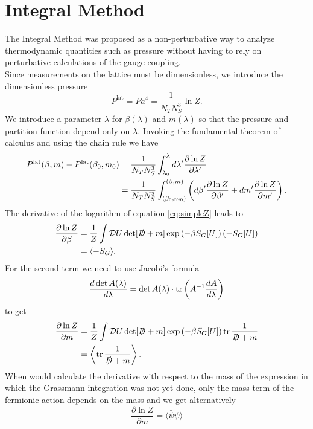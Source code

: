 \section{Integral Method}
The Integral Method\cite{firstIntegralMethod} was proposed as a non-perturbative way to analyze thermodynamic quantities such as pressure without having to rely on perturbative calculations of the gauge coupling. \\
Since measurements on the lattice must be dimensionless, we introduce the dimensionless pressure
\begin{equation}
    P^{\text{lat}}=Pa^4=\frac{1}{N_TN_S^3}\ln Z.
\end{equation}
We introduce a parameter $\lambda$ for $\beta(\lambda)$ and $m(\lambda)$ so that the pressure and partition function depend only on $\lambda$. Invoking the fundamental theorem of calculus and using the chain rule we have
\begin{align}
    P^{\text{lat}}(\beta, m)-P^{\text{lat}}(\beta_0,m_0)&=\frac1{N_TN_S^3}\int_{\lambda_0}^{\lambda}d\lambda'\frac{\partial \ln Z}{\partial \lambda'}\\
    &=\frac{1}{N_TN_S^3}\int_{(\beta_0,m_0)}^{(\beta,m)}\left(d\beta'\frac{\partial\ln Z}{\partial \beta'}+dm'\frac{\partial \ln Z}{\partial m'}\right).
\end{align}
The derivative of the logarithm of equation \eqref{eq:simpleZ} leads to
\begin{align}
    \frac{\partial \ln Z}{\partial \beta}&=\frac{1}{Z}\int \mathcal DU \det[\slashed D+m]\exp\left(-\beta S_G[U]\right) (-S_G[U])\\
    &=\langle-S_G\rangle.
\end{align}
For the second term we need to use Jacobi's formula
\begin{equation}
    \frac{d\det A(\lambda)}{d\lambda}=\det A(\lambda)\cdot\operatorname{tr}\left(A^{-1}\frac{dA}{d\lambda}\right)
\end{equation}
to get
\begin{align}
     \frac{\partial \ln Z}{\partial m}&=\frac{1}{Z}\int \mathcal DU \det[\slashed D+m]\exp\left(-\beta S_G[U]\right) \operatorname{tr}\frac{1}{\slashed D+m}\\
     &=\left\langle\operatorname{tr}\frac{1}{\slashed D+m}\right\rangle.
\end{align}
When would calculate the derivative with respect to the mass of the expression in which the Grassmann integration was not yet done, only the mass term of the fermionic action depends on the mass and we get alternatively
\begin{equation}
     \frac{\partial \ln Z}{\partial m}=\langle\bar\psi\psi\rangle
\end{equation}
